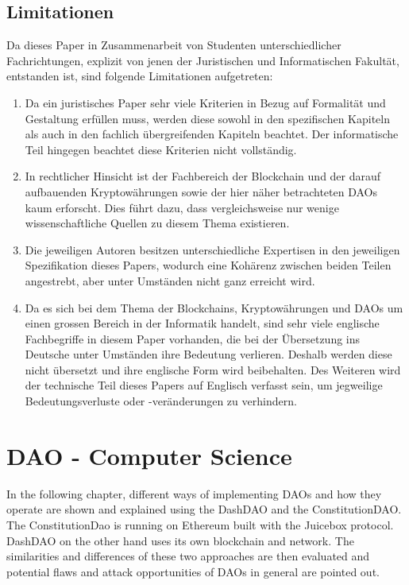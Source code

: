 \documentclass[a4paper,12pt]{report}
\begin{document}
	\vspace*{-1.25em}\section{Limitationen}\vspace*{-0.5em}
	\startsection
	    Da dieses Paper in Zusammenarbeit von Studenten unterschiedlicher Fachrichtungen, explizit von jenen der Juristischen und Informatischen Fakultät, entstanden ist, sind folgende Limitationen aufgetreten:
	    \begin{enumerate}
	        \item Da ein juristisches Paper sehr viele Kriterien in Bezug auf Formalität und Gestaltung erfüllen muss, werden diese sowohl in den spezifischen Kapiteln als auch in den fachlich übergreifenden Kapiteln beachtet. Der informatische Teil hingegen beachtet diese Kriterien nicht vollständig.
	        \item In rechtlicher Hinsicht ist der Fachbereich der Blockchain und der darauf aufbauenden Kryptowährungen sowie der hier näher betrachteten DAOs kaum erforscht. Dies führt dazu, dass vergleichsweise nur wenige wissenschaftliche Quellen zu diesem Thema existieren.
	        \item Die jeweiligen Autoren besitzen unterschiedliche Expertisen in den jeweiligen Spezifikation dieses Papers, wodurch eine Kohärenz zwischen beiden Teilen angestrebt, aber unter Umständen nicht ganz erreicht wird.
	        \item Da es sich bei dem Thema der Blockchains, Kryptowährungen und DAOs um einen grossen Bereich in der Informatik handelt, sind sehr viele englische Fachbegriffe in diesem Paper vorhanden, die bei der Übersetzung ins Deutsche unter Umständen ihre Bedeutung verlieren. Deshalb werden diese nicht übersetzt und ihre englische Form wird beibehalten. Des Weiteren wird der technische Teil dieses Papers auf Englisch verfasst sein, um jegweilige Bedeutungsverluste oder -veränderungen zu verhindern.
	    \end{enumerate}
	\closesection
	
	
	\chapter[DAO - CS]{DAO - Computer Science}
	In the following chapter, different ways of implementing DAOs and how they operate are shown and explained using the DashDAO and the ConstitutionDAO. The ConstitutionDao is running on Ethereum built with the Juicebox protocol. DashDAO on the other hand uses its own blockchain and network. The similarities and differences of these two approaches are then evaluated and potential flaws and attack opportunities of DAOs in general are pointed out.
	
\end{document}
